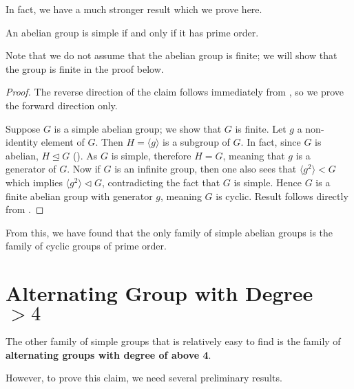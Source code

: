 In fact, we have a much stronger result which we prove here.
\begin{theorem}\label{thrm-abelian-group-simple-iff-cylic-group-of-prime-order}
    An abelian group is simple if and only if it has prime order.
\end{theorem}
Note that we do not assume that the abelian group is finite; we will show that the group is finite in the proof below.
\begin{proof}
    The reverse direction of the claim follows immediately from , so we prove the forward direction only.
    
    Suppose $G$ is a simple abelian group; we show that $G$ is finite. Let $g$ a non-identity element of $G$. Then $H = \langle g \rangle$ is a subgroup of $G$. In fact, since $G$ is abelian, $H \unlhd G$ (). As $G$ is simple, therefore $H = G$, meaning that $g$ is a generator of $G$. Now if $G$ is an infinite group, then one also sees that $\langle g^2 \rangle < G$ which implies $\langle g^2 \rangle \lhd G$, contradicting the fact that $G$ is simple. Hence $G$ is a finite abelian group with generator $g$, meaning $G$ is cyclic. Result follows directly from .
\end{proof}

From this, we have found that the only family of simple abelian groups is the family of cyclic groups of prime order.

\section{Alternating Group with Degree \texorpdfstring{$>4$}{More Than 4}}
The other family of simple groups that is relatively easy to find is the family of \textbf{alternating groups with degree of above 4}.

However, to prove this claim, we need several preliminary results.

